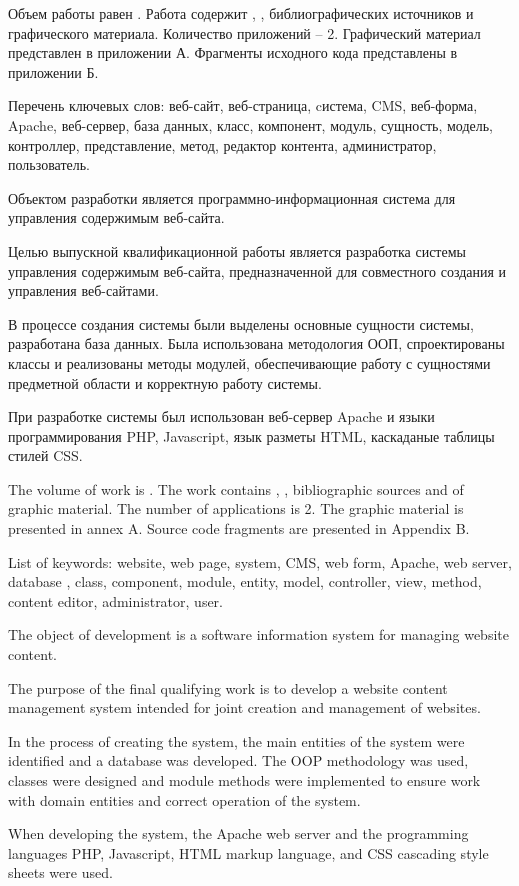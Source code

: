 
Объем работы равен . Работа содержит , ,  библиографических источников и  графического материала. Количество приложений – 2. Графический материал представлен в приложении А. Фрагменты исходного кода представлены в приложении Б.

Перечень ключевых слов: веб-сайт, веб-страница, cистема, CMS, веб-форма, Apache, веб-сервер, база данных, класс, компонент, модуль, сущность, модель, контроллер, представление, метод, редактор контента, администратор, пользователь.

Объектом разработки является программно-информационная система для управления содержимым веб-сайта.

Целью выпускной квалификационной работы является разработка системы управления содержимым веб-сайта, предназначенной для совместного создания и управления веб-сайтами.

В процессе создания системы были выделены основные сущности системы, разработана база данных. Была использована методология ООП, спроектированы классы и реализованы методы модулей, обеспечивающие работу с сущностями предметной области и корректную работу системы.

При разработке системы был использован веб-сервер Apache и языки программирования PHP, Javascript, язык разметы HTML, каскаданые таблицы стилей CSS.

  
The volume of work is . The work contains , ,  bibliographic sources and  of graphic material. The number of applications is 2. The graphic material is presented in annex A. Source code fragments are presented in Appendix B.

List of keywords: website, web page, system, CMS, web form, Apache, web server, database , class, component, module, entity, model, controller, view, method, content editor, administrator, user.

The object of development is a software information system for managing website content.

The purpose of the final qualifying work is to develop a website content management system intended for joint creation and management of websites.

In the process of creating the system, the main entities of the system were identified and a database was developed. The OOP methodology was used, classes were designed and module methods were implemented to ensure work with domain entities and correct operation of the system.

When developing the system, the Apache web server and the programming languages ​​PHP, Javascript, HTML markup language, and CSS cascading style sheets were used.

